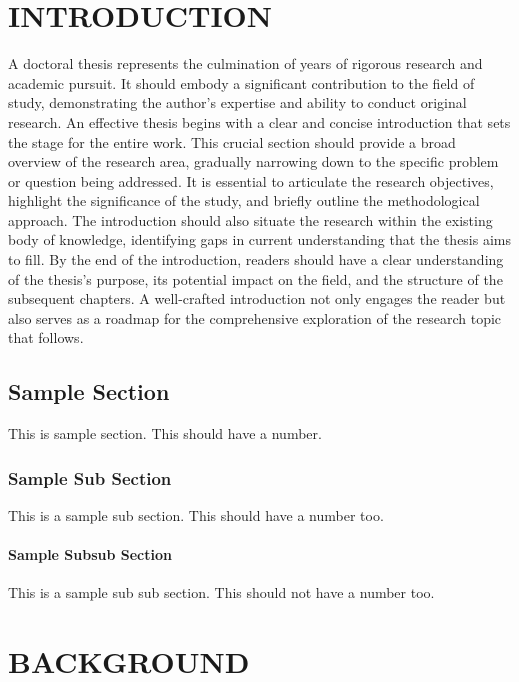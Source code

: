 \documentclass{kgtu}
\begin{document}
\chapter{INTRODUCTION}
A doctoral thesis represents the culmination of years of rigorous research and academic pursuit. It should embody a significant contribution to the field of study, demonstrating the author's expertise and ability to conduct original research. \cite{oztoprak2023technological}An effective thesis begins with a clear and concise introduction that sets the stage for the entire work. This crucial section should provide a broad overview of the research area, gradually narrowing down to the specific problem or question being addressed. It is essential to articulate the research objectives, highlight the significance of the study, and briefly outline the methodological approach. \cite{butun2021application}The introduction should also situate the research within the existing body of knowledge, identifying gaps in current understanding that the thesis aims to fill. By the end of the introduction, readers should have a clear understanding of the thesis's purpose, its potential impact on the field, and the structure of the subsequent chapters. A well-crafted introduction not only engages the reader but also serves as a roadmap for the comprehensive exploration of the research topic that follows.\cite{oztoprak2023holistic}
\section{Sample Section}
This is sample section. This should have a number.
\lipsum[1-3]
\subsection{Sample Sub Section}
This is a sample sub section. This should have a number too.
\lipsum[4-5]
\subsubsection{Sample Subsub Section}
This is a sample sub sub section. This should not have a number too.
\lipsum[6-7]
\chapter{BACKGROUND}
\end{document}
